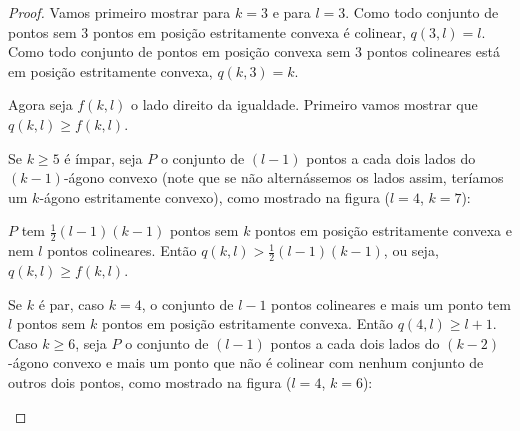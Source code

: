\begin{proof}
    Vamos primeiro mostrar para $k=3$ e para $l=3$.
    Como todo conjunto de pontos sem $3$ pontos em posição estritamente convexa é colinear, $q(3,l) = l$.
    Como todo conjunto de pontos em posição convexa sem $3$ pontos colineares está em posição estritamente convexa, $q(k,3)=k$.

    Agora seja $f(k,l)$ o lado direito da igualdade. Primeiro vamos mostrar que $q(k,l)\geq f(k,l)$.

    Se $k\geq5$ é ímpar, seja $P$ o conjunto de $(l-1)$ pontos a cada dois lados do $(k-1)$-ágono convexo (note que se não alternássemos os lados assim, teríamos um $k$-ágono estritamente convexo), como mostrado na figura ($l=4$, $k=7$):
    \begin{center}
    \end{center}
   
    $P$ tem $\frac{1}{2}(l-1)(k-1)$ pontos sem $k$ pontos em posição estritamente convexa e nem $l$ pontos colineares. Então $q(k,l)>\frac{1}{2}(l-1)(k-1)$, ou seja, $q(k,l)\geq f(k,l)$.

    Se $k$ é par, caso $k=4$, o conjunto de $l-1$ pontos colineares e mais um ponto tem $l$ pontos sem $k$ pontos em posição estritamente convexa. Então $q(4,l)\geq l+1$.
    Caso $k\geq 6$, seja $P$ o conjunto de $(l-1)$ pontos a cada dois lados do $(k-2)$-ágono convexo e mais um ponto que não é colinear com nenhum conjunto de outros dois pontos, como mostrado na figura ($l=4$, $k=6$):
    \begin{center}
\end{center}
\end{proof}
